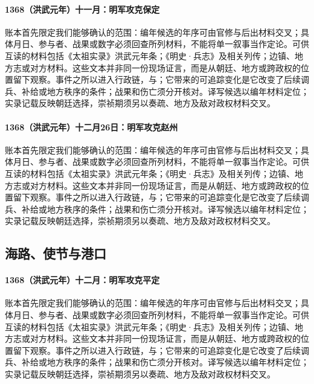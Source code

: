 \paragraph{1368（洪武元年）十一月：明军攻克保定} 账本首先限定我们能够确认的范围：编年候选的年序可由官修与后出材料交叉；具体月日、参与者、战果或数字必须回查所列材料，不能将单一叙事当作定论。可供互读的材料包括《太祖实录》洪武元年条；《明史·兵志》及相关列传；边镇、地方志或对方材料。这些文本并非同一份现场证言，而是从朝廷、地方或跨政权的位置留下观察。事件之所以进入行政链，与；它带来的可追踪变化是它改变了后续调兵、补给或地方秩序的条件；战果和伤亡须分开核对。译写候选以编年材料定位；实录记载反映朝廷选择，崇祯期须另以奏疏、地方及敌对政权材料交叉。

\paragraph{1368（洪武元年）十二月26日：明军攻克赵州} 账本首先限定我们能够确认的范围：编年候选的年序可由官修与后出材料交叉；具体月日、参与者、战果或数字必须回查所列材料，不能将单一叙事当作定论。可供互读的材料包括《太祖实录》洪武元年条；《明史·兵志》及相关列传；边镇、地方志或对方材料。这些文本并非同一份现场证言，而是从朝廷、地方或跨政权的位置留下观察。事件之所以进入行政链，与；它带来的可追踪变化是它改变了后续调兵、补给或地方秩序的条件；战果和伤亡须分开核对。译写候选以编年材料定位；实录记载反映朝廷选择，崇祯期须另以奏疏、地方及敌对政权材料交叉。

\subsection{海路、使节与港口}

\paragraph{1368（洪武元年）十二月：明军攻克平定} 账本首先限定我们能够确认的范围：编年候选的年序可由官修与后出材料交叉；具体月日、参与者、战果或数字必须回查所列材料，不能将单一叙事当作定论。可供互读的材料包括《太祖实录》洪武元年条；《明史·兵志》及相关列传；边镇、地方志或对方材料。这些文本并非同一份现场证言，而是从朝廷、地方或跨政权的位置留下观察。事件之所以进入行政链，与；它带来的可追踪变化是它改变了后续调兵、补给或地方秩序的条件；战果和伤亡须分开核对。译写候选以编年材料定位；实录记载反映朝廷选择，崇祯期须另以奏疏、地方及敌对政权材料交叉。

